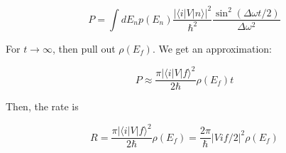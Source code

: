 \documentclass{article}
\newtheorem{one minute paper}[theorem]{One Minute Paper}
\begin{document}
\begin{equation}
    P = \int dE_n p(E_n)\frac{| \langle i | V | n \rangle |^2}{\hbar^2}\frac{\sin^2(\Delta\omega t/2)}{\Delta \omega^2}
\end{equation}

For $t \rightarrow \infty$, then pull out $\rho(E_f)$. We get an approximation: 

\begin{equation}
    P \approx \frac{\pi | \langle i | V | f \rangle^2}{2\hbar}\rho(E_f)t
\end{equation}

Then, the rate is 

\begin{equation}
    R = \frac{\pi | \langle i | V | f \rangle^2}{2\hbar}\rho(E_f) = \frac{2\pi }{\hbar}|Vif/2|^2\rho(E_f)
\end{equation}
\end{document}
